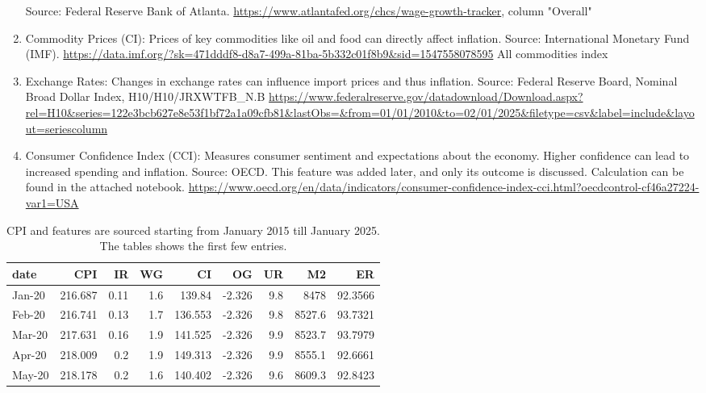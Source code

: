 \documentclass{article}
\begin{document}
\begin{enumerate}
            Source: Federal Reserve Bank of Atlanta.
            \url{https://www.atlantafed.org/chcs/wage-growth-tracker}, column "Overall"
      \item Commodity Prices (CI): Prices of key commodities like oil and food can directly affect inflation.
            Source:
            International Monetary Fund (IMF). \url{https://data.imf.org/?sk=471dddf8-d8a7-499a-81ba-5b332c01f8b9&sid=1547558078595}
            All commodities index
      \item Exchange Rates: Changes in exchange rates can influence import prices and thus inflation. Source:
            Federal Reserve Board,
            Nominal Broad Dollar Index, H10/H10/JRXWTFB\_N.B
            \url{https://www.federalreserve.gov/datadownload/Download.aspx?rel=H10&series=122e3bcb627e8e53f1bf72a1a09cfb81&lastObs=&from=01/01/2010&to=02/01/2025&filetype=csv&label=include&layout=seriescolumn}
      \item Consumer Confidence Index (CCI): Measures consumer sentiment and expectations about the economy.
            Higher confidence can lead to increased spending and inflation. Source: OECD.
            This feature was added later, and only its outcome is discussed.
            Calculation can be found in the attached notebook.
            \url{https://www.oecd.org/en/data/indicators/consumer-confidence-index-cci.html?oecdcontrol-cf46a27224-var1=USA}
\end{enumerate}


\begin{table}
      \caption{CPI and features are sourced starting from January 2015 till January 2025. The tables shows the first few entries.}
      \begin{tabular}{lrrrrrrrr}
            \toprule
            date   & CPI     & IR   & WG  & CI      & OG     & UR  & M2     & ER      \\
            \midrule
            Jan-20 & 216.687 & 0.11 & 1.6 & 139.84  & -2.326 & 9.8 & 8478   & 92.3566 \\
            Feb-20 & 216.741 & 0.13 & 1.7 & 136.553 & -2.326 & 9.8 & 8527.6 & 93.7321 \\
            Mar-20 & 217.631 & 0.16 & 1.9 & 141.525 & -2.326 & 9.9 & 8523.7 & 93.7979 \\
            Apr-20 & 218.009 & 0.2  & 1.9 & 149.313 & -2.326 & 9.9 & 8555.1 & 92.6661 \\
            May-20 & 218.178 & 0.2  & 1.6 & 140.402 & -2.326 & 9.6 & 8609.3 & 92.8423 \\
            \bottomrule
      \end{tabular}
\end{table}
\end{document}
